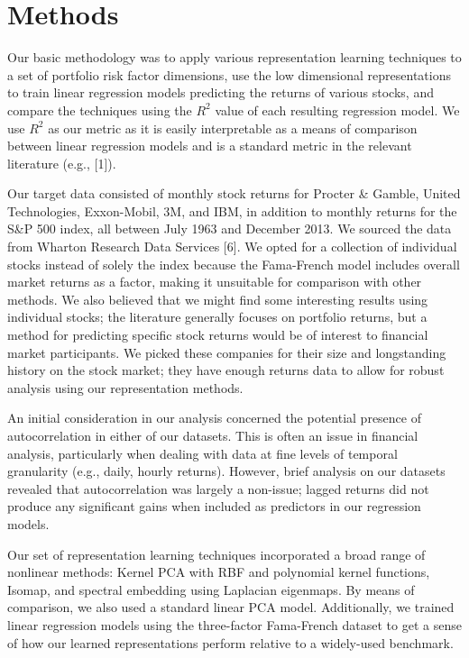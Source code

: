 \documentclass[a4paper]{article}
\begin{document}
   \section{Methods}
   \par Our basic methodology was to apply various representation learning techniques to a set of portfolio risk factor dimensions, use the low dimensional representations to train linear regression models predicting the returns of various stocks, and compare the techniques using the $R^2$ value of each resulting regression model. We use $R^2$ as our metric as it is easily interpretable as a means of comparison between linear regression models and is a standard metric in the relevant literature (e.g., [1]). 
   \par Our target data consisted of monthly stock returns for Procter \& Gamble, United Technologies, Exxon-Mobil, 3M, and IBM, in addition to monthly returns for the S\&P 500 index, all between July 1963 and December 2013. We sourced the data from Wharton Research Data Services [6]. We opted for a collection of individual stocks instead of solely the index because the Fama-French model includes overall market returns as a factor, making it unsuitable for comparison with other methods. We also believed that we might find some interesting results using individual stocks; the literature generally focuses on portfolio returns, but a method for predicting specific stock returns would be of interest to financial market participants. We picked these companies for their size and longstanding history on the stock market; they have enough returns data to allow for robust analysis using our representation methods.
   \par An initial consideration in our analysis concerned the potential presence of autocorrelation in either of our datasets. This is often an issue in financial analysis, particularly when dealing with data at fine levels of temporal granularity (e.g., daily, hourly returns). However, brief analysis on our datasets revealed that autocorrelation was largely a non-issue; lagged returns did not produce any significant gains when included as predictors in our regression models. 
   \par Our set of representation learning techniques incorporated a broad range of nonlinear methods: Kernel PCA with RBF and polynomial kernel functions, Isomap, and spectral embedding using Laplacian eigenmaps. By means of comparison, we also used a standard linear PCA model. Additionally, we trained linear regression models using the three-factor Fama-French dataset to get a sense of how our learned representations perform relative to a widely-used benchmark.
\end{document}
